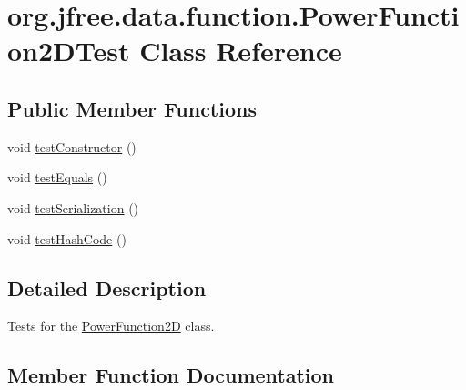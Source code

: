 \hypertarget{classorg_1_1jfree_1_1data_1_1function_1_1_power_function2_d_test}{}\section{org.\+jfree.\+data.\+function.\+Power\+Function2\+D\+Test Class Reference}
\label{classorg_1_1jfree_1_1data_1_1function_1_1_power_function2_d_test}
\subsection*{Public Member Functions}
\begin{DoxyCompactItemize}
\item 
void \mbox{\hyperlink{classorg_1_1jfree_1_1data_1_1function_1_1_power_function2_d_test_a07893df89ef0aa4d2801b14a8fe2b814}{test\+Constructor}} ()
\item 
void \mbox{\hyperlink{classorg_1_1jfree_1_1data_1_1function_1_1_power_function2_d_test_afd12de881e694571e793cd969a91955b}{test\+Equals}} ()
\item 
void \mbox{\hyperlink{classorg_1_1jfree_1_1data_1_1function_1_1_power_function2_d_test_a2842e070c6c8889d79ba7e7e4fa58bf5}{test\+Serialization}} ()
\item 
void \mbox{\hyperlink{classorg_1_1jfree_1_1data_1_1function_1_1_power_function2_d_test_aca157908b87e8ac410f998f777b8d101}{test\+Hash\+Code}} ()
\end{DoxyCompactItemize}


\subsection{Detailed Description}
Tests for the \mbox{\hyperlink{classorg_1_1jfree_1_1data_1_1function_1_1_power_function2_d}{Power\+Function2D}} class. 

\subsection{Member Function Documentation}
\mbox{\label{classorg_1_1jfree_1_1data_1_1function_1_1_power_function2_d_test_a07893df89ef0aa4d2801b14a8fe2b814}} 
